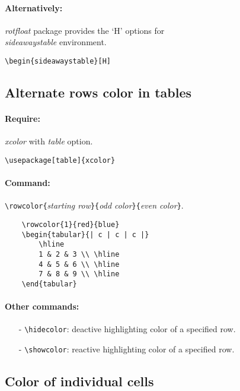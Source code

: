 \paragraph{Alternatively:} \emph{rotfloat} package provides the `H' options for \\
\emph{sideawaystable} environment.
\begin{verbatim}
\begin{sideawaystable}[H]
\end{verbatim}

\subsection{Alternate rows color in tables}
\paragraph{Require:} \emph{xcolor} with \emph{table} option.
\begin{verbatim}
\usepackage[table]{xcolor}
\end{verbatim}
\paragraph{Command:} \verb|\rowcolor{|\emph{starting row}\verb|}{|\emph{odd color}\verb|}{|\emph{even color}\verb|}|.
\begin{verbatim}
	\rowcolor{1}{red}{blue}
	\begin{tabular}{| c | c | c |}
		\hline
		1 & 2 & 3 \\ \hline
		4 & 5 & 6 \\ \hline
		7 & 8 & 9 \\ \hline
	\end{tabular}
\end{verbatim}

\paragraph{Other commands:}
\begin{itemize}
	\item[-] \verb|\hidecolor|: deactive highlighting color of a specified row.
	\item[-] \verb|\showcolor|: reactive highlighting color of a specified row.
\end{itemize}

\subsection{Color of individual cells}

